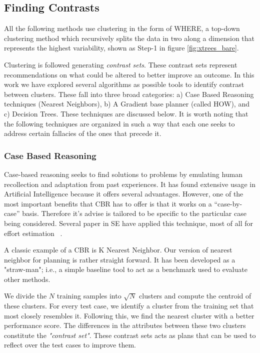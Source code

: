 \documentclass{sig-alternate}
\begin{document}
\subsection{Finding Contrasts}
All the following methods use clustering in the form of WHERE, a top-down clustering method which recursively splits the data in two along a dimension that represents the highest variability, shown as Step-1 in figure \ref{fig:xtrees_bare}. 

Clustering is followed generating \textit{contrast sets}. These contrast sets represent recommendations on what could be altered to better improve an outcome. In this work we have explored several algorithms as possible tools to identify contrast between clusters. These fall into three broad categories: a) Case Based Reasoning techniques (Nearest Neighbors), b) A Gradient base planner (called HOW), and c) Decision Trees. These techniques are discussed below. It is worth noting that the following techniques are organized in such a way that each one seeks to address certain fallacies of the ones that precede it. 

\subsubsection{Case Based Reasoning}

Case-based reasoning seeks to find solutions to problems by emulating human recollection and adaptation from past experiences. It has found extensive usage in Artificial Intelligence because it offers several advantages. However, one of the most important benefits that CBR has to offer is that it works on a ``case-by-case'' basis. Therefore it's advise is tailored to be specific to the particular case being considered. Several paper in SE have applied this technique, most of all for effort estimation ~\cite{keung2008analogy, 6600685, walkerden1999empirical, shepperd1997estimating, kocaguneli2010use}. 

A classic example of a CBR is K Nearest Neighbor. Our version of nearest neighbor for planning is rather straight forward. It has been developed as a "straw-man"; i.e., a simple baseline tool to act as a benchmark used to evaluate other methods. 

We divide the $N$ training samples into $\sqrt{N}$ clusters and compute the centroid of these clusters. For every test case, we identify a cluster from the training set that most closely resembles it. Following this, we find the nearest cluster with a better performance score. The differences in the attributes between these two clusters constitute the \textit{"contrast set"}. These contrast sets acts as plans that can be used to reflect over the test cases to improve them.
\end{document}
